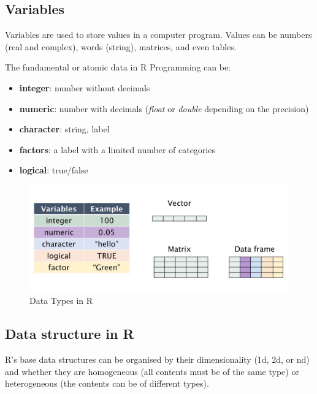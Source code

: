 \documentclass[
]{book}
\providecommand{\tightlist}{%
  \setlength{\itemsep}{0pt}\setlength{\parskip}{0pt}}
\begin{document}
\hypertarget{variables}{%
\subsection{Variables}\label{variables}}

Variables are used to store values in a computer program.
Values can be numbers (real and complex), words (string), matrices, and even tables.

The fundamental or atomic data in R Programming can be:

\begin{itemize}
\tightlist
\item
  \textbf{integer}: number without decimals
\item
  \textbf{numeric}: number with decimals (\emph{float} or \emph{double} depending on the precision)
\item
  \textbf{character}: string, label
\item
  \textbf{factors}: a label with a limited number of categories
\item
  \textbf{logical}: true/false
\end{itemize}

\begin{figure}

{\centering \includegraphics[width=1\linewidth,height=0.8\textheight]{images/Rvariablesdata} 

}

\caption{Data Types in R \label{data_Type}}\label{fig:img1}
\end{figure}

\newpage

\hypertarget{data-structure-in-r}{%
\subsection{Data structure in R}\label{data-structure-in-r}}

R's base data structures can be organised by their dimensionality (1d, 2d, or nd) and whether they are homogeneous (all contents must be of the same type) or heterogeneous (the contents can be of different types).
\end{document}
